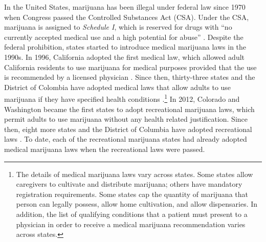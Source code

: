 \documentclass[12pt]{article}%
\begin{document}
In the United States, marijuana has been illegal under federal law since 1970 when Congress passed the Controlled Substances Act (CSA). Under the CSA, marijuana is assigned to \textit{Schedule I}, which is reserved for drugs with “no currently accepted medical use and a high potential for abuse” \citep{DEA2019}. Despite the federal prohibition, states started to introduce medical marijuana laws in the 1990s. In 1996, California adopted the first medical law, which allowed adult California residents to use marijuana for medical purposes provided that the use is recommended by a licensed physician \citep{Reinarman2011}. Since then, thirty-three states and the District of Colombia have adopted medical laws that allow adults to use marijuana if they have specified health conditions \citep{ProCon2018b}.\footnote{The details of medical marijuana laws vary across states. Some states allow caregivers to cultivate and distribute marijuana; others have mandatory registration requirements. Some states cap the quantity of marijuana that person can legally possess, allow home cultivation, and allow dispensaries. In addition, the list of qualifying conditions that a patient must present to a physician in order to receive a medical marijuana recommendation varies across states.} In 2012, Colorado and Washington became the first states to adopt recreational marijuana laws, which permit adults to use marijuana without any health related justification. Since then, eight more states and the District of Columbia have adopted recreational laws \citep{ProCon2018}. To date, each of the recreational marijuana states had already adopted medical marijuana laws when the recreational laws were passed.
\end{document}
